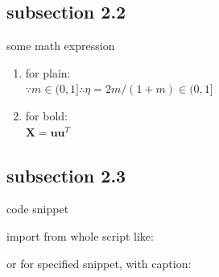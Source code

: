\documentclass[11pt]{beamer}
\begin{document}
\subsection{subsection 2.2}
\begin{frame}{some math expression}
	\begin{enumerate}
		\item for plain: \\ $\because m \in (0, 1] \therefore \eta = 2m/(1+m) \in (0, 1]$
		\item for bold: \\ $\boldsymbol{X} = \boldsymbol{uu}^T$
	\end{enumerate}
\end{frame}

\subsection{subsection 2.3}
\begin{frame}{code snippet}
	\begin{minipage}[t]{0.5\textwidth}
		import from whole script like:
		
    \end{minipage}%
    \hfill
    \begin{minipage}[t]{0.45\textwidth}
    		or for specified snippet, with caption:
    		
    \end{minipage}
\end{frame}
\end{document}

